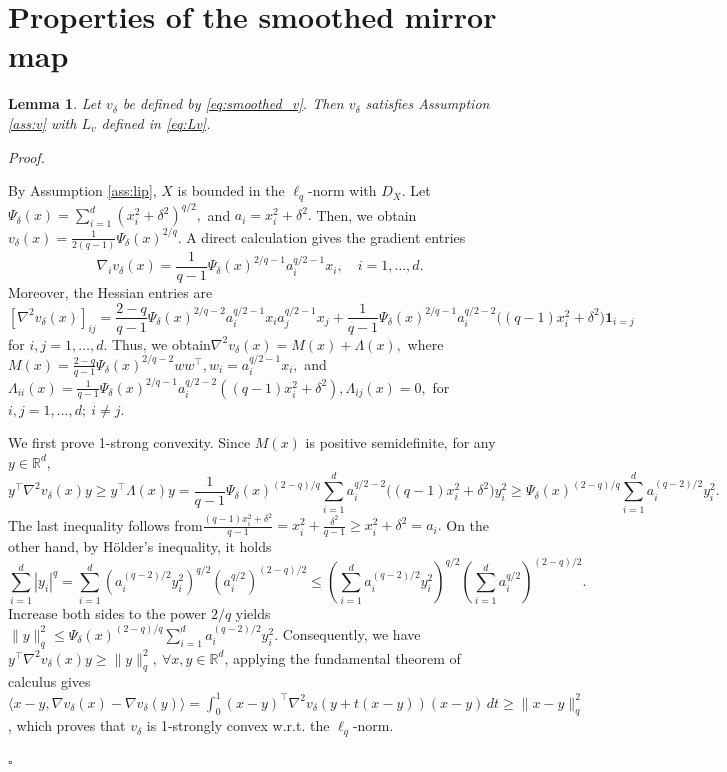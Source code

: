 \documentclass[11pt]{article}
\newtheorem{lemma}{Lemma}[section]
\newenvironment{proof}[1][Proof]{%
    \par\noindent\textit{#1.}\enspace
  }{%
    \hfill\ensuremath{\square}\par
  }%
\numberwithin{equation}{section}
\begin{document}


\appendix
\section{Properties of the smoothed mirror map}
\label{app:smooth-mirror}
\begin{lemma}\label{lem:smooth-mirror-map}
Let $v_\delta$ be defined by \eqref{eq:smoothed_v}. %
Then $v_\delta$ satisfies Assumption \ref{ass:v}
with $L_v$ defined in \eqref{eq:Lv}.
\end{lemma}
\begin{proof}
By Assumption \ref{ass:lip}, $X$ is bounded in the $\ell_q$-norm with $D_X$.
Let
\( \Psi_\delta(x)=\sum_{i=1}^d (x_i^2+\delta^2)^{q/2},\) and \(a_i=x_i^2+\delta^2 .\)
Then, we obtain
\(
    v_\delta(x)=\frac{1}{2(q-1)}\Psi_\delta(x)^{2/q}.
\) 
A direct calculation gives the gradient entries
\[
    \nabla_i v_\delta(x)=\frac{1}{q-1}\Psi_\delta(x)^{2/q-1}a_i^{q/2-1}x_i ,\quad i=1,\ldots,d.
\]
Moreover, the Hessian entries are
\[
    [\nabla^2 v_\delta(x)]_{ij}
    =\frac{2-q}{q-1}\Psi_\delta(x)^{2/q-2}a_i^{q/2-1}x_ia_j^{q/2-1}x_j                +\frac{1}{q-1}\Psi_\delta(x)^{2/q-1}a_i^{q/2-2}\big((q-1)x_i^2+\delta^2\big)\mathbf 1_{{i=j}} 
\]
for $i,j=1,\ldots,d.$ 
Thus, we obtain\(\nabla^2 v_\delta(x)=M(x)+\Lambda(x),\) where \(M(x)=\frac{2-q}{q-1}\Psi_\delta(x)^{2/q-2}ww^\top, w_i=a_i^{q/2-1}x_i,\) and \(\Lambda_{ii}(x)=\frac{1}{q-1}\Psi_\delta(x)^{2/q-1}a_i^{q/2-2}((q-1)x_i^2+\delta^2), \Lambda_{ij}(x)=0, \) for \(i,j=1,\ldots,d;\ i\ne j .\)

We first prove 1-strong convexity. Since $M(x)$ is positive semidefinite, for any $y\in\mathbb R^d$,
\[
    y^\top \nabla^2 v_\delta(x)y
    \ge
    y^\top \Lambda(x)y     =
    \frac{1}{q-1}
\Psi_\delta(x)^{(2-q)/q}
    \sum_{i=1}^d
    a_i^{q/2-2}
    \big((q-1)x_i^2+\delta^2\big)y_i^2    
\ge\Psi_\delta(x)^{(2-q)/q}
    \sum_{i=1}^d
    a_i^{(q-2)/2}y_i^2 .
\]
The last inequality follows from\(\frac{(q-1)x_i^2+\delta^2}{q-1}=x_i^2+\frac{\delta^2}{q-1}\ge x_i^2+\delta^2=a_i .\) On the other hand, by H\"older's inequality, it holds
\[
    \sum_{i=1}^d |y_i|^q
    =
    \sum_{i=1}^d
    (a_i^{(q-2)/2}y_i^2)^{q/2}
    (a_i^{q/2})^{(2-q)/2}       
    \le
    (\sum_{i=1}^d a_i^{(q-2)/2}y_i^2)^{q/2}
    (\sum_{i=1}^d a_i^{q/2})^{(2-q)/2}.
\]
Increase both sides to the power $2/q$ yields \(\|y\|_q^2\le\Psi_\delta(x)^{(2-q)/q}\sum_{i=1}^d a_i^{(q-2)/2}y_i^2 .\) Consequently, we have \(y^\top \nabla^2 v_\delta(x)y\ge\|y\|_q^2 ,\ \forall x,y\in\mathbb R^d\), applying the fundamental theorem of calculus gives
\(\langle x-y,\nabla v_\delta(x)-\nabla v_\delta(y)\rangle=\int_0^1(x-y)^\top\nabla^2v_\delta(y+t(x-y))(x-y)\,dt\geq
\|x-y\|_q^2\), which proves that $v_\delta$ is 1-strongly convex w.r.t. the $\ell_q$-norm.


\end{proof}
\end{document}
